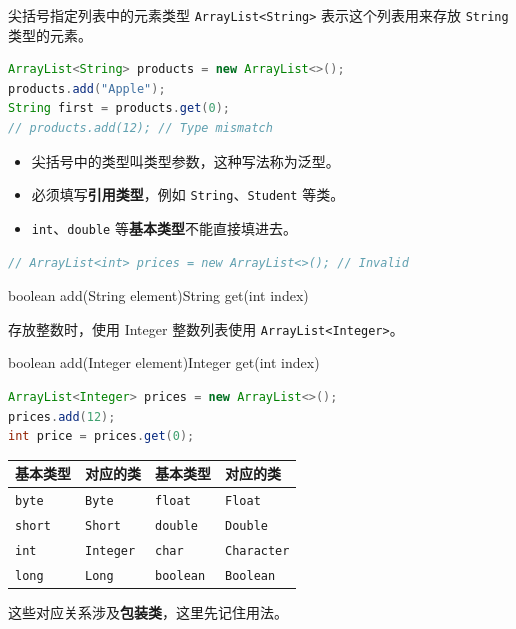 \documentclass[aspectratio=169]{beamer}
\begin{document}
\begin{frame}[fragile]{尖括号指定列表中的元素类型}
  \texttt{ArrayList<String>} 表示这个列表用来存放 \texttt{String} 类型的元素。
  \begin{lstlisting}[language=Java]
ArrayList<String> products = new ArrayList<>();
products.add("Apple");
String first = products.get(0);
// products.add(12); // Type mismatch
  \end{lstlisting}
  \begin{itemize}
    \item 尖括号中的类型叫\alert{类型参数}，这种写法称为\alert{泛型}。
    \item 必须填写\textbf{引用类型}，例如 \texttt{String}、\texttt{Student} 等类。
    \item \texttt{int}、\texttt{double} 等\textbf{基本类型}不能直接填进去。
  \end{itemize}
  \begin{lstlisting}[language=Java]
// ArrayList<int> prices = new ArrayList<>(); // Invalid
  \end{lstlisting}
  {\small\ttfamily boolean add(String element)\quad String get(int index)}
  \par
\end{frame}

\begin{frame}[fragile]{存放整数时，使用 Integer}
  整数列表使用 \texttt{ArrayList<Integer>}。
  \par
  {\small\ttfamily boolean add(Integer element)\quad Integer get(int index)}
  \begin{lstlisting}[language=Java]
ArrayList<Integer> prices = new ArrayList<>();
prices.add(12);
int price = prices.get(0);
  \end{lstlisting}
  \par\medskip
  \begingroup
    \centering
    \renewcommand{\arraystretch}{1.2}
    \begin{tabular}{llll}
      \textbf{基本类型} & \textbf{对应的类} & \textbf{基本类型} & \textbf{对应的类} \\
      \hline
      \texttt{byte} & \texttt{Byte} & \texttt{float} & \texttt{Float} \\
      \texttt{short} & \texttt{Short} & \texttt{double} & \texttt{Double} \\
      \texttt{int} & \texttt{Integer} & \texttt{char} & \texttt{Character} \\
      \texttt{long} & \texttt{Long} & \texttt{boolean} & \texttt{Boolean} \\
    \end{tabular}
    \par
  \endgroup
  \medskip
  这些对应关系涉及\textbf{包装类}，这里先记住用法。
\end{frame}
\end{document}
